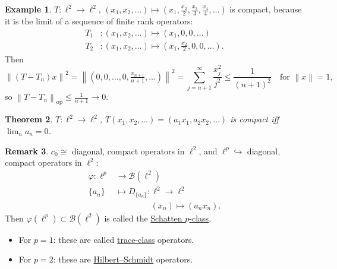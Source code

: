 \documentclass[12pt]{article}
\newcommand{\norm}[1]{\left\| #1 \right\|}
\newcommand{\cB}{\mathcal{B}}
\newtheorem{thm}{Theorem}[section]
\theoremstyle{definition}
\newtheorem{ex}[thm]{Example}
\newtheorem{rmk}[thm]{Remark}
\begin{document}
\begin{ex}
	$T : \ell^2 \to \ell^2$, $(x_1, x_2, \dots) \mapsto \left( x_1, \frac{x_2}{2}, \frac{x_3}{3}, \frac{x_4}{4}, \dots \right)$ is compact, because it is the limit of a sequence of finite rank operators:
	\begin{align*}
		T_1 &: (x_1, x_2, \dots) \mapsto (x_1, 0, 0, \dots) \\
		T_2 &: (x_1, x_2, \dots) \mapsto \left( x_1, \tfrac{x_2}{2}, 0, 0, \dots \right).
	\end{align*}
	Then
	\begin{equation*}
		\norm{(T - T_n)x}^2 = \norm{\left( 0, 0, \dots, 0, \tfrac{x_{n+1}}{n+1}, \dots \right)}^2 = \sum_{j=n+1}^\infty \frac{x_j^2}{j^2} \leq \frac{1}{(n+1)^2} \quad \text{for } \norm{x} = 1,
	\end{equation*}
	so $\norm{T - T_n}_{\mathrm{op}} \leq \frac{1}{n+1} \to 0$.
\end{ex}

\begin{thm}
	$T : \ell^2 \to \ell^2$, $T(x_1, x_2, \dots) = (a_1x_1, a_2x_2, \dots)$ is compact iff $\lim_n a_n = 0$.
\end{thm}

\begin{rmk}
	$c_0 \cong$ diagonal, compact operators in $\ell^2$, and $\ell^p \hookrightarrow$ diagonal, compact operators in $\ell^2$:
	\begin{align*}
		\varphi : \ell^p &\to \cB(\ell^2) \\
		\lbrace a_n \rbrace &\mapsto D_{\lbrace a_n \rbrace} : \ell^2 \to \ell^2 \\
		&\qquad\qquad\ (x_n) \mapsto (a_n x_n).
	\end{align*}
	Then $\varphi(\ell^p) \subset \cB(\ell^2)$ is called the \underline{Schatten $p$-class}.
	\begin{itemize}[nosep]
		\item For $p=1$: these are called \underline{trace-class} operators.
		\item For $p=2$: these are \underline{Hilbert--Schmidt} operators.
	\end{itemize}
\end{rmk}
\end{document}
